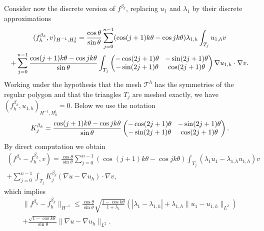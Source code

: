 \documentclass[JEP,XML,SOM,Unicode,ThmDefs,NoFloatCountersInSection,published]{cedram}
\newcommand{\colsep}{\arraycolsep4.5pt}
\theoremstyle{plain}
\theoremstyle{definition}
\begin{document}
Consider now the discrete version of $f^{\beta_k}$, replacing $u_1$ and $\lambda_1$ by their discrete approximations
\vspace*{-8pt}
\begin{multline*}
(f_h^{\beta_k},v)_{H^{-1},H_0^1} = \frac{\cos \theta}{\sin \theta}\sum_{j=0}^{n-1} (\cos(j+1)k\theta-\cos jk\theta) \lambda_{1,h} \int_{T_j} u_{1,h}v\\\colsep
+ \sum_{j=0}^{n-1} \frac{\cos(j+1)k\theta-\cos jk\theta}{\sin \theta} \int_{T_j}\begin{pmatrix}
-\cos (2j+1)\theta & -\sin (2j+1) \theta \\
-\sin (2j+1)\theta & \cos (2j+1)\theta
\end{pmatrix}\nabla u_{1,h} \cdot \nabla v.
\end{multline*}
Working under the hypothesis that the mesh $\mathcal T^h$ has the symmetries of the regular polygon and that the triangles $T_j$ are meshed exactly, we have $(f_h^{\beta_k},u_{1,h})_{H^{-1},H_0^1} = 0$. Below we use the notation
\[\colsep
K_j^{\beta_k} = \frac{\cos(j+1)k\theta-\cos jk\theta}{\sin \theta} \begin{pmatrix}
-\cos (2j+1)\theta & -\sin (2j+1) \theta \\
-\sin(2j+1)\theta & \cos (2j+1)\theta
\end{pmatrix}.
\]
By direct computation we obtain\vspace*{-5pt}
\begin{multline*}
(f^{\beta_k}-f^{\beta_k}_h,v) 
= \frac{\cos \theta}{\sin \theta}\sum_{j=0}^{n-1} (\cos (j+1)k\theta-\cos jk\theta) \int_{T_j}(\lambda_1 u_1-\lambda_{1,h}u_{1,h})v\\
+ \sum_{j=0}^{n-1} \int_{T_j}K_j^{\beta_k}(\nabla u - \nabla u_h)\cdot \nabla v,
\end{multline*}
which implies
\vspace*{-5pt}
\begin{multline*}
\|f^{\beta_k}-f_h^{\beta_k} \|_{H^{-1}}\leq \frac{\cos \theta}{\sin \theta} \sqrt{\frac{1-\cos k\theta}{1+\lambda_1}}(|\lambda_1-\lambda_{1,h}|+\lambda_{1,h}\|u_1-u_{1,h}\|_{L^2}) \\
+ \frac{\sqrt{1-\cos k\theta}}{\sin \theta} \|\nabla u-\nabla u_h\|_{L^2}.
\end{multline*}
\end{document}
